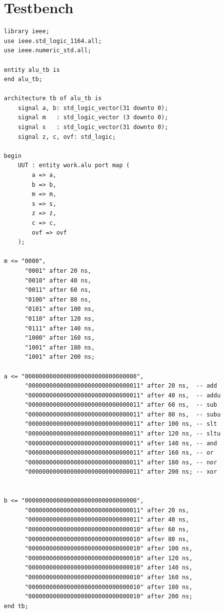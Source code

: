 \documentclass[dvipsnames, svgnames, x11names, a4paper, 11pt]{article}
\begin{document}
\section{Testbench}
\begin{lstlisting}
library ieee;
use ieee.std_logic_1164.all;
use ieee.numeric_std.all;

entity alu_tb is
end alu_tb;

architecture tb of alu_tb is
    signal a, b: std_logic_vector(31 downto 0);
    signal m   : std_logic_vector (3 downto 0);
    signal s   : std_logic_vector(31 downto 0);
    signal z, c, ovf: std_logic;

begin
    UUT : entity work.alu port map (
        a => a,
        b => b,
        m => m,
        s => s,
        z => z,
        c => c,
        ovf => ovf
    );

m <= "0000",
      "0001" after 20 ns,
      "0010" after 40 ns,
      "0011" after 60 ns,
      "0100" after 80 ns,
      "0101" after 100 ns,
      "0110" after 120 ns,
      "0111" after 140 ns,
      "1000" after 160 ns,
      "1001" after 180 ns,
      "1001" after 200 ns;

a <= "00000000000000000000000000000000",
      "00000000000000000000000000000011" after 20 ns,  -- add
      "00000000000000000000000000000011" after 40 ns,  -- addu
      "00000000000000000000000000000011" after 60 ns,  -- sub
      "00000000000000000000000000000011" after 80 ns,  -- subu
      "00000000000000000000000000000011" after 100 ns, -- slt
      "00000000000000000000000000000011" after 120 ns, -- sltu
      "00000000000000000000000000000011" after 140 ns, -- and
      "00000000000000000000000000000011" after 160 ns, -- or
      "00000000000000000000000000000011" after 180 ns, -- nor
      "00000000000000000000000000000011" after 200 ns; -- xor


b <= "00000000000000000000000000000000",
      "00000000000000000000000000000011" after 20 ns,
      "00000000000000000000000000000011" after 40 ns,
      "00000000000000000000000000000010" after 60 ns,
      "00000000000000000000000000000010" after 80 ns,
      "00000000000000000000000000000010" after 100 ns,
      "00000000000000000000000000000010" after 120 ns,
      "00000000000000000000000000000010" after 140 ns,
      "00000000000000000000000000000010" after 160 ns,
      "00000000000000000000000000000010" after 180 ns,
      "00000000000000000000000000000010" after 200 ns;
end tb;
\end{lstlisting}
\end{document}
